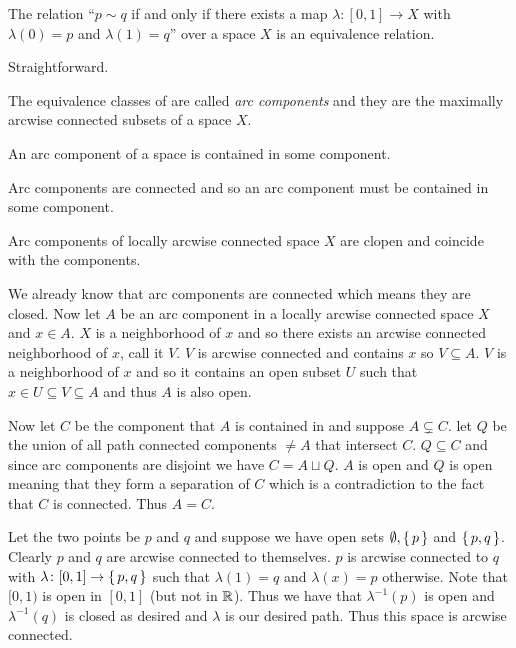 \documentclass[letterpaper, 11pt]{article}
\begin{document}
\begin{prop}\label{prop: arc_eq_rel}
  The relation ``$p \sim q$ if and only if there exists a map $\lambda\colon [0, 1] \to X$ with $\lambda(0) = p$ and $\lambda(1) = q$'' over a space $X$ is an equivalence relation.
\end{prop}
\begin{pf}
  Straightforward.
\end{pf}

\begin{defn}
  The equivalence classes of  are called \emph{arc components} and they are the maximally arcwise connected subsets of a space $X$.
\end{defn}

\begin{prop}
  An arc component of a space is contained in some component.
\end{prop}
\begin{pf}
  Arc components are connected and so an arc component must be contained in some component.
\end{pf}

\begin{prop}
  Arc components of locally arcwise connected space $X$ are clopen and coincide with the components.
\end{prop}
\begin{pf}
  We already know that arc components are connected which means they are closed.
  Now let $A$ be an arc component in a locally arcwise connected space $X$ and $x \in A$.
  $X$ is a neighborhood of $x$ and so there exists an arcwise connected neighborhood of $x$, call it $V$.
  $V$ is arcwise connected and contains $x$ so $V \subseteq A$.
  $V$ is a neighborhood of $x$ and so it contains an open subset $U$ such that $x \in U \subseteq V \subseteq A$ and thus $A$ is also open.

  Now let $C$ be the component that $A$ is contained in and suppose $A \subsetneq C$.
  let $Q$ be the union of all path connected components $\neq A$ that intersect $C$.
  $Q \subseteq C$ and since arc components are disjoint we have $C = A \sqcup Q$.
  $A$ is open and  $Q$ is open meaning that they form a separation of $C$ which is a contradiction to the fact that $C$ is connected.
  Thus $A = C$.
\end{pf}

\begin{ex}
  Let the two points be $p$ and $q$ and suppose we have open sets $\emptyset, \set{p}$ and $\set{p, q}$.
  Clearly $p$ and $q$ are arcwise connected to themselves.
  $p$ is arcwise connected to $q$ with $\lambda\colon [0, 1] \to \set{p, q}$ such that $\lambda(1) = q$ and $\lambda(x) = p$ otherwise.
  Note that $[0, 1)$ is open in $[0, 1]$ (but not in $\mathbb{R}$).
  Thus we have that $\lambda^{-1}(p)$ is open and $\lambda^{-1}(q)$ is closed as desired and $\lambda$ is our desired path.
  Thus this space is arcwise connected.
\end{ex}
\end{document}
